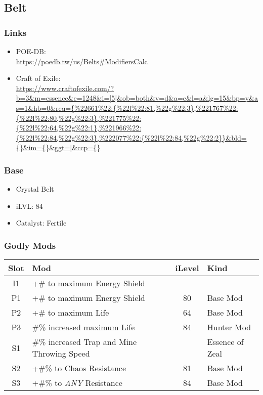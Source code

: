 \subsection{Belt}
\subsubsection{Links}
\begin{itemize}
	\item POE-DB:\\
	\url{https://poedb.tw/us/Belts#ModifiersCalc}
	\item Craft of Exile:\\
		\url{https://www.craftofexile.com/?b=3&m=essence&e=1248&i=|5|&ob=both&v=d&a=e&l=a&lg=15&bp=y&as=1&hb=0&req={%
\end{itemize}

\subsubsection{Base}
\begin{itemize}
	\item Crystal Belt
	\item iLVL: 84
	\item Catalyst: Fertile
\end{itemize}

\subsubsection{Godly Mods}
\begin{tabular}{|c|l|c|l|}
	\hline
	Slot&Mod&iLevel&Kind\\\hline
	I1& +\# to maximum Energy Shield&& \\\hline
	P1& +\# to maximum Energy Shield&80& Base Mod \\\hline
	P2& +\# to maximum Life&64& Base Mod \\\hline
	P3&\#\% increased maximum Life&84& Hunter Mod \\\hline
	S1&\#\% increased Trap and Mine Throwing Speed&&Essence of Zeal \\\hline
	S2&+\#\% to Chaos Resistance&81&Base Mod \\\hline
	S3&+\#\% to \emph{ANY} Resistance&84&Base Mod \\\hline
\end{tabular}

